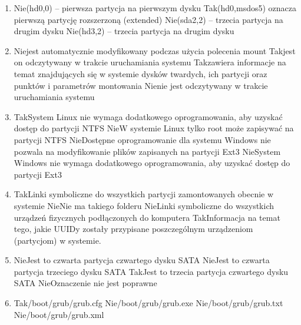 \begin{enumerate}
	\item {}%
	{Nie}{(hd0,0) – pierwsza partycja na pierwszym dysku}%
	{Tak}{(hd0,msdos5) oznacza pierwszą partycję rozszerzoną (extended)}%
	{Nie}{(sda2,2) – trzecia partycja na drugim dysku}%
	{Nie}{(hd3,2) – trzecia partycja na drugim dysku}

	\item {}%
	{Nie}{jest automatycznie modyfikowany podczas użycia polecenia mount}%
	{Tak}{jest on odczytywany w trakcie uruchamiania systemu}%
	{Tak}{zawiera informacje na temat znajdujących się w systemie dysków twardych, ich partycji oraz punktów i parametrów montowania}%
	{Nie}{nie jest odczytywany w trakcie uruchamiania systemu}

	\item {}%
	{Tak}{System Linux nie wymaga dodatkowego oprogramowania, aby uzyskać dostęp do partycji NTFS}%
	{Nie}{W systemie Linux tylko root może zapisywać na partycji NTFS}%
	{Nie}{Dostępne oprogramowanie dla systemu Windows nie pozwala na modyfikowanie plików zapisanych na partycji Ext3}%
	{Nie}{System Windows nie wymaga dodatkowego oprogramowania, aby uzyskać dostęp do partycji Ext3}

	\item {}%
	{Tak}{Linki symboliczne do wszystkich partycji zamontowanych obecnie w systemie}%
	{Nie}{Nie ma takiego folderu}%
	{Nie}{Linki symboliczne do wszystkich urządzeń fizycznych podłączonych do komputera}%
	{Tak}{Informacja na temat tego, jakie UUIDy zostały przypisane poszczególnym urządzeniom (partycjom) w systemie.}

	\item {}%
	{Nie}{Jest to czwarta partycja czwartego dysku SATA}%
	{Nie}{Jest to czwarta partycja trzeciego dysku SATA}%
	{Tak}{Jest to trzecia partycja czwartego dysku SATA}%
	{Nie}{Oznaczenie nie jest poprawne}

	\item {}%
	{Tak}{/boot/grub/grub.cfg}%
	{Nie}{/boot/grub/grub.exe}%
	{Nie}{/boot/grub/grub.txt}%
	{Nie}{/boot/grub/grub.xml}


	
	
	
		
\end{enumerate}